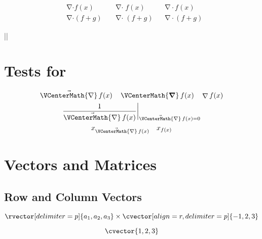 \documentclass[parskip=half]{scrartcl}
\begin{document}
\begin{Example}[gobble=2,label={Ideas for Divergence Operators}]
  \begin{align*}
  &{\mathop{\nabla}\nolimits}\cdot f(x)
  &
  &\mathop{\mathop{\nabla}\nolimits\cdot} f(x)
  &
  &\mathop{\nabla}\nolimits{}\cdot f(x)\\
  &{\mathop{\nabla}\nolimits}\cdot (f+g)
  &
  &\mathop{\mathop{\nabla}\nolimits\cdot} (f+g)
  &
  &\mathop{\nabla}\nolimits{}\cdot (f+g)
  \end{align*}
\end{Example}

|\VCenterMath|
\section{Tests for }

\begin{Example}[gobble=2]
  \begin{gather*}
    \mathop{\vec{\VCenterMath{\nabla}}}\nolimits f(x)
    \quad \mathop{\VCenterMath{\boldsymbol\nabla}}\nolimits f(x)
    \quad \mathop{\nabla}\nolimits f(x)\\
    \frac{1}{\mathop{\vec{\VCenterMath{\nabla}}}\nolimits f(x)}
    \bigg\vert_{\mathop{\vec{\VCenterMath{\nabla}}}\nolimits f(x) = 0}\\
    x_{\mathop{\vec{\VCenterMath{\nabla}}}\nolimits f(x)} \quad x_{f(x)}
  \end{gather*}
\end{Example}

\section{Vectors and Matrices}

\subsection{Row and Column Vectors}

\begin{Example}[gobble=2]
  \[
    \rvector[delimiter=p]{a_{1},a_{2},a_{3}}
    \times \cvector[align=r,delimiter=p]{-1,2,3}
  \]
\end{Example}

\fulllinerule

\begin{SideBySideExample}[xrightmargin=.5\textwidth,gobble=2]
  \[
    \cvector{1,2,3}
  \]
\end{SideBySideExample}
\end{document}
